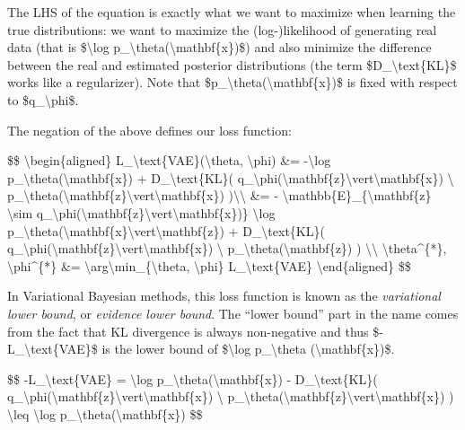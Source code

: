 The LHS of the equation is exactly what we want to maximize when learning the true distributions: we want to maximize the (log-)likelihood of generating real data (that is \$\textbackslash log p\_\textbackslash theta(\textbackslash mathbf\{x\})\$) and also minimize the difference between the real and estimated posterior distributions (the term \$D\_\textbackslash text\{KL\}\$ works like a regularizer). Note that \$p\_\textbackslash theta(\textbackslash mathbf\{x\})\$ is fixed with respect to \$q\_\textbackslash phi\$.

The negation of the above defines our loss function:

\$\$ \textbackslash begin\{aligned\} L\_\textbackslash text\{VAE\}(\textbackslash theta, \textbackslash phi) \&= -\textbackslash log p\_\textbackslash theta(\textbackslash mathbf\{x\}) + D\_\textbackslash text\{KL\}( q\_\textbackslash phi(\textbackslash mathbf\{z\}\textbackslash vert\textbackslash mathbf\{x\}) \textbackslash\textbar{} p\_\textbackslash theta(\textbackslash mathbf\{z\}\textbackslash vert\textbackslash mathbf\{x\}) )\textbackslash\textbackslash{} \&= - \textbackslash mathbb\{E\}\_\{\textbackslash mathbf\{z\} \textbackslash sim q\_\textbackslash phi(\textbackslash mathbf\{z\}\textbackslash vert\textbackslash mathbf\{x\})\} \textbackslash log p\_\textbackslash theta(\textbackslash mathbf\{x\}\textbackslash vert\textbackslash mathbf\{z\}) + D\_\textbackslash text\{KL\}( q\_\textbackslash phi(\textbackslash mathbf\{z\}\textbackslash vert\textbackslash mathbf\{x\}) \textbackslash\textbar{} p\_\textbackslash theta(\textbackslash mathbf\{z\}) ) \textbackslash\textbackslash{} \textbackslash theta\^{}\{*\}, \textbackslash phi\^{}\{*\} \&= \textbackslash arg\textbackslash min\_\{\textbackslash theta, \textbackslash phi\} L\_\textbackslash text\{VAE\} \textbackslash end\{aligned\} \$\$

In Variational Bayesian methods, this loss function is known as the \emph{variational lower bound}, or \emph{evidence lower bound}. The ``lower bound'' part in the name comes from the fact that KL divergence is always non-negative and thus \$-L\_\textbackslash text\{VAE\}\$ is the lower bound of \$\textbackslash log p\_\textbackslash theta (\textbackslash mathbf\{x\})\$.

\$\$ -L\_\textbackslash text\{VAE\} = \textbackslash log p\_\textbackslash theta(\textbackslash mathbf\{x\}) - D\_\textbackslash text\{KL\}( q\_\textbackslash phi(\textbackslash mathbf\{z\}\textbackslash vert\textbackslash mathbf\{x\}) \textbackslash\textbar{} p\_\textbackslash theta(\textbackslash mathbf\{z\}\textbackslash vert\textbackslash mathbf\{x\}) ) \textbackslash leq \textbackslash log p\_\textbackslash theta(\textbackslash mathbf\{x\}) \$\$

